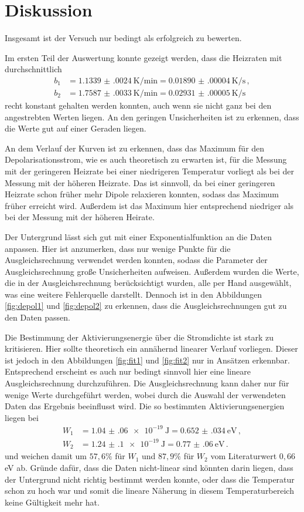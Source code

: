 \newpage
\section{Diskussion}
\label{sec:Diskussion}

Insgesamt ist der Versuch nur bedingt als erfolgreich zu bewerten.

Im ersten Teil der Auswertung konnte gezeigt werden, dass die Heizraten mit
durchschnittlich
\begin{align*}
  b_1&=\SI{1.1339(0024)}{\kelvin\per\minute}= \SI{0.01890(00004)}{\kelvin\per\second}\,, \\
  b_2&=\SI{1.7587(0033)}{\kelvin\per\minute}= \SI{0.02931(00005)}{\kelvin\per\second}\,
\end{align*}
recht konstant gehalten werden konnten, auch wenn sie nicht ganz bei den angestrebten
Werten liegen. An den geringen Unsicherheiten ist zu erkennen, dass die Werte gut auf einer
Geraden liegen.

An dem Verlauf der Kurven ist zu erkennen, dass das Maximum für den Depolarisationsstrom,
wie es auch theoretisch zu erwarten ist, für die Messung mit der geringeren Heizrate bei
einer niedrigeren Temperatur vorliegt als bei der Messung mit der höheren Heizrate. Das ist
sinnvoll, da bei einer geringeren Heizrate schon früher mehr Dipole relaxieren konnten, sodass
das Maximum früher erreicht wird. Außerdem ist das Maximum hier entsprechend niedriger als
bei der Messung mit der höheren Heirate.

Der Untergrund lässt sich gut mit einer Exponentialfunktion an die Daten anpassen.
Hier ist anzumerken, dass nur wenige Punkte für die Ausgleichsrechnung verwendet
werden konnten, sodass die Parameter der Ausgleichsrechnung große Unsicherheiten
aufweisen. Außerdem wurden die Werte, die in der Ausgleichsrechnung berücksichtigt wurden,
alle per Hand ausgewählt, was eine weitere Fehlerquelle darstellt. Dennoch ist in den
Abbildungen \ref{fig:depol1} und \ref{fig:depol2} zu erkennen, dass die Ausgleichsrechnungen
gut zu den Daten passen.

Die Bestimmung der Aktivierungsenergie über die Stromdichte ist stark zu kritisieren.
Hier sollte theoretisch ein annähernd linearer Verlauf vorliegen. Dieser ist jedoch
in den Abbildungen \ref{fig:fit1} und \ref{fig:fit2} nur in Ansätzen erkennbar.
Entsprechend erscheint es auch nur bedingt sinnvoll hier eine lineare Ausgleichsrechnung
durchzuführen. Die Ausgleichsrechnung kann daher nur für wenige Werte durchgeführt
werden, wobei durch die Auswahl der verwendeten Daten das Ergebnis beeinflusst
wird. Die so bestimmten Aktivierungsenergien liegen bei
\begin{align}
  W_1&=\SI{1.04(06)e-19}{\joule}= \SI{0.652(034)}{\eV}  \,, \\
  W_2&=\SI{1.24(10)e-19}{\joule}=\SI{0.77(06)}{\eV} \,.
\end{align}
und weichen damit um $57{,}6\%$ für $W_1$ und $87,9\%$ für
$W_2$ vom Literaturwert $0{,}66\,$eV ab.
Gründe dafür, dass die Daten nicht-linear sind könnten darin liegen, dass der Untergrund
nicht richtig bestimmt werden konnte, oder dass die Temperatur schon zu hoch war und somit
die lineare Näherung in diesem Temperaturbereich keine Gültigkeit mehr hat.

